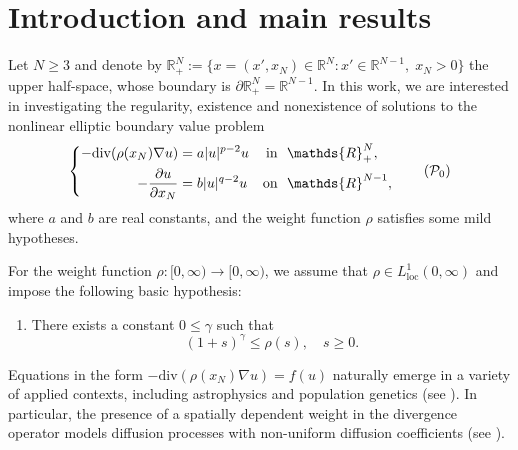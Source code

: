 \documentclass[12pt,reqno]{amsart}
\begin{document}
	
	

%
%
\section{Introduction and main results}

Let $N \geq 3$ and denote by 
$\mathds{R}^N_+ := \{x=(x',x_N) \in \mathds{R}^N : x' \in \mathds{R}^{N-1}, \; x_N > 0\}$ 
the upper half-space, whose boundary is $\partial \mathds{R}^N_+ = \mathds{R}^{N-1}$.
 In this work, we are interested in investigating the regularity, existence and nonexistence of solutions to the nonlinear elliptic boundary  value problem
  \begin{equation}\label{PG}
		\left\{
		\begin{aligned}
			-\mathrm{div}(\rho(x_N) \nabla u) &=a|u|^{p-2}u &\mbox{in }&\ \mathds{R}^N_+,
			\vspace{0.2cm}\\
			-\frac{\partial u}{\partial x_N}&=b|u|^{q-2}u&\mbox{on }&\
			\mathds{R}^{N-1},
		\end{aligned}
		\right. 
		\tag{$\mathcal{P}_0$}
	\end{equation}
 where $a$ and $b$ are real constants, and the weight function $\rho$ satisfies some mild hypotheses.


 
For the weight function $\rho : [0,\infty) \to [0,\infty)$, we assume that $\rho \in L^1_{\mathrm{loc}}(0,\infty)$ and impose the following basic hypothesis:
\begin{enumerate}
    \item [$(\rho_0)$] There exists a constant $0\leq\gamma$ such that 
    $$
    (1+s)^\gamma\leq \rho(s),\quad s\geq0.
    $$ 
\end{enumerate}
Equations in the form $-\mathrm{div}(\rho(x_N)\nabla u)=f(u)$ naturally emerge in a variety of applied contexts, including astrophysics and population genetics (see \cite{Aronson, Chandra, Li-Ni}). In particular, the presence of a spatially dependent weight in the divergence operator models diffusion processes with non-uniform diffusion coefficients (see \cite{Lina}).
\end{document}
